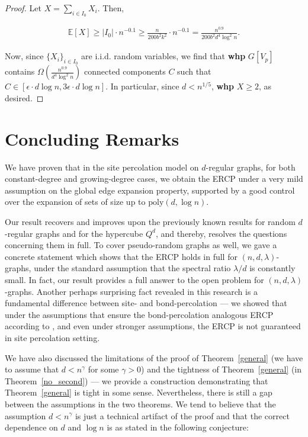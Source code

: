 \documentclass[notitlepage]{scrartcl}
\begin{document}
\begin{proof}
    Let $X=\sum_{i\in I_0}X_i$. Then,
    
    \begin{align*}
        \mathbb{E}[X]\ge |I_0|\cdot n^{-0.1}\ge \frac{n}{200b^2k^2}\cdot n^{-0.1}=\frac{n^{0.9}}{200b^2d^4\log^2 n}.
    \end{align*}
    
    Now, since $\{X_i\}_{i\in I_0}$ are i.i.d. random variables, we find that \textbf{whp} $G[V_p]$ contains $\Omega\left(\frac{n^{0.9}}{d^4\log^2 n}\right)$ connected components $C$ such that $C\in [\epsilon\cdot d\log n,3\epsilon\cdot d\log n]$. In particular, since $d<n^{1/5}$, \textbf{whp} $X\ge 2$, as desired.
\end{proof}

\section{Concluding Remarks}\label{discussion}

We have proven that in the site percolation model on $d$-regular graphs, for both constant-degree and growing-degree cases, we obtain the ERCP under a very mild assumption on the global edge expansion property, supported by a good control over the expansion of sets of size up to $\text{poly}(d,\log n)$. 

Our result recovers and improves upon the previously known results for random $d$-regular graphs and for the hypercube $Q^d$, and thereby, resolves the questions concerning them in full. To cover pseudo-random graphs as well, we gave a concrete statement which shows that the ERCP holds in full for $(n,d,\lambda)$-graphs, under the standard assumption that the spectral ratio $\lambda/d$ is constantly small. In fact, our result provides a full answer to the open problem for $(n,d,\lambda)$-graphs. Another perhaps surprising fact revealed in this research is a fundamental difference between site- and bond-percolation --- we showed that under the assumptions that ensure the bond-percolation analogous ERCP according to \cite{diskin2025componentslargesmalli}, and even under stronger assumptions, the ERCP is not guaranteed in site percolation setting.

We have also discussed the limitations of the proof of Theorem~\ref{general} (we have to assume that $d<n^{\gamma}$ for some $\gamma>0$) and the tightness of Theorem~\ref{general} (in Theorem~\ref{no_second}) --- we provide a construction demonstrating that Theorem~\ref{general} is tight in some sense. Nevertheless, there is still a gap between the assumptions in the two theorems. We tend to believe that the assumption $d<n^{\gamma}$ is just a technical artifact of the proof and that the correct dependence on $d$ and $\log n$ is as stated in the following conjecture:
\end{document}
